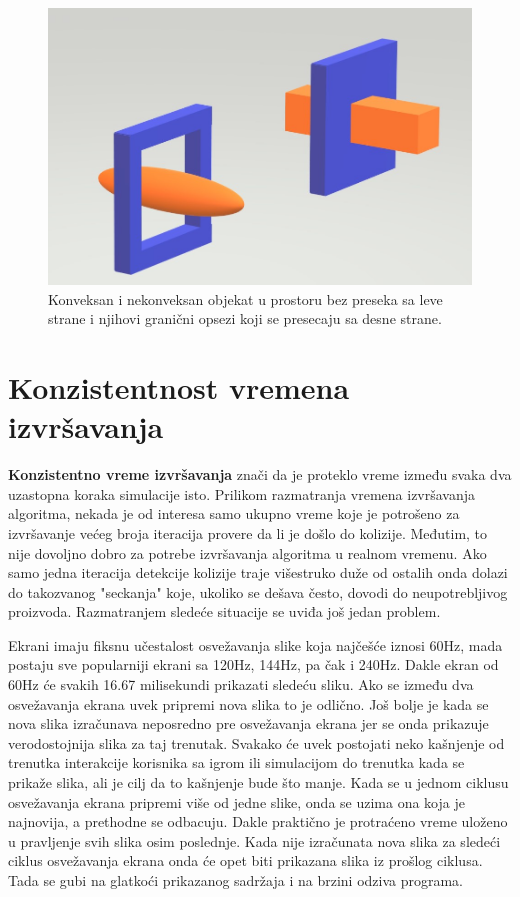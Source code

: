\documentclass[12pt,oneside]{memoir}
\begin{document}
\begin{figure}[h!]
	\centering
	\includegraphics[scale=0.5]{falseCollision.jpg}
	\caption{Konveksan i nekonveksan objekat u prostoru bez preseka sa leve strane i
	njihovi granični opsezi koji se presecaju sa desne strane. }
	\label{fig:falseCollision}
\end{figure}


\section{Konzistentnost vremena izvršavanja}

\textbf{Konzistentno vreme izvršavanja} znači da je proteklo vreme između svaka dva uzastopna koraka simulacije isto.
Prilikom razmatranja vremena izvršavanja algoritma, nekada je od interesa 
samo ukupno vreme koje je potrošeno za izvršavanje većeg broja iteracija provere da li je došlo do kolizije. 
Međutim, to nije dovoljno dobro za potrebe izvršavanja algoritma u realnom vremenu.
Ako samo jedna iteracija 
detekcije kolizije traje višestruko duže od ostalih onda dolazi do takozvanog "seckanja"
koje, ukoliko se dešava često, dovodi do neupotrebljivog proizvoda.
Razmatranjem sledeće situacije se uviđa još jedan problem.

Ekrani imaju fiksnu učestalost osvežavanja slike koja najčešće iznosi 60Hz, mada postaju sve popularniji
ekrani sa 120Hz, 144Hz, pa čak i 240Hz. Dakle ekran od 60Hz će svakih 16.67 milisekundi prikazati sledeću sliku. 
Ako se između dva osvežavanja ekrana uvek pripremi nova slika to je odlično. 
Još bolje je kada se nova slika izračunava neposredno pre osvežavanja ekrana jer se onda 
prikazuje verodostojnija slika za taj trenutak. 
Svakako će uvek postojati neko kašnjenje od trenutka interakcije korisnika sa igrom ili simulacijom do
trenutka kada se prikaže slika, ali je cilj da to kašnjenje bude što manje. 
Kada se u jednom ciklusu osvežavanja ekrana pripremi više od jedne slike, onda se uzima ona koja je najnovija,
a prethodne se odbacuju. 
Dakle praktično je protraćeno vreme uloženo u pravljenje svih slika osim poslednje.
Kada nije izračunata nova slika za sledeći ciklus osvežavanja ekrana onda će opet biti prikazana slika
iz prošlog ciklusa. Tada se gubi na glatkoći prikazanog sadržaja i na brzini odziva programa. 
\end{document}
